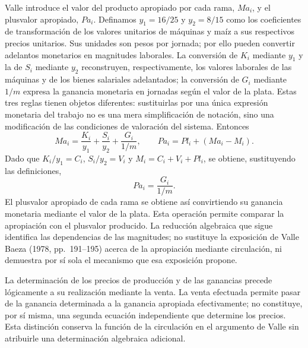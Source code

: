 \documentclass[10pt,twoside]{article}
\begin{document}
Valle introduce el valor del producto apropiado por cada rama, $Ma_i$, y el plusvalor apropiado, $Pa_i$. Definamos $y_1=16/25$ y $y_2=8/15$ como los coeficientes de transformación de los valores unitarios de máquinas y maíz a sus respectivos precios unitarios. Sus unidades son pesos por jornada; por ello pueden convertir adelantos monetarios en magnitudes laborales. La conversión de $K_i$ mediante $y_1$ y la de $S_i$ mediante $y_2$ reconstruyen, respectivamente, los valores laborales de las máquinas y de los bienes salariales adelantados; la conversión de $G_i$ mediante $1/m$ expresa la ganancia monetaria en jornadas según el valor de la plata. Estas tres reglas tienen objetos diferentes: sustituirlas por una única expresión monetaria del trabajo no es una mera simplificación de notación, sino una modificación de las condiciones de valoración del sistema. Entonces
\begin{equation}
Ma_i=\frac{K_i}{y_1}+\frac{S_i}{y_2}+\frac{G_i}{1/m},
\qquad
Pa_i=Pl_i+(Ma_i-M_i).\label{eq:aprop}
\end{equation}
Dado que $K_i/y_1=C_i$, $S_i/y_2=V_i$ y $M_i=C_i+V_i+Pl_i$, se obtiene, sustituyendo las definiciones,
\begin{equation}
Pa_i=\frac{G_i}{1/m}.\label{eq:pa}
\end{equation}
El plusvalor apropiado de cada rama se obtiene así convirtiendo su ganancia monetaria mediante el valor de la plata. Esta operación permite comparar la apropiación con el plusvalor producido. La reducción algebraica que sigue identifica las dependencias de las magnitudes; no sustituye la exposición de Valle Baeza (1978, pp.~191--195) acerca de la apropiación mediante circulación, ni demuestra por sí sola el mecanismo que esa exposición propone.

La determinación de los precios de producción y de las ganancias precede lógicamente a su realización mediante la venta. La venta efectuada permite pasar de la ganancia determinada a la ganancia apropiada efectivamente; no constituye, por sí misma, una segunda ecuación independiente que determine los precios. Esta distinción conserva la función de la circulación en el argumento de Valle sin atribuirle una determinación algebraica adicional.

\end{document}

